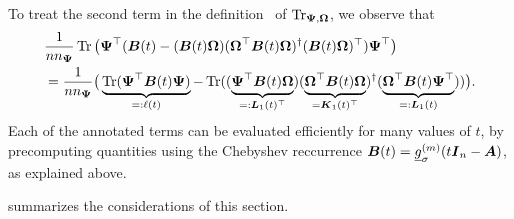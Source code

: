 To treat the second term in the definition~ of $\operatorname{Tr}_{\boldsymbol{\Psi}, \boldsymbol{\Omega}}$, we observe that 
\begin{align}
    &\frac{1}{n n_{\boldsymbol{\Psi}}} \operatorname{Tr} \big(\boldsymbol{\Psi}^{\top} (\boldsymbol{B}(t) - (\boldsymbol{B}(t) \boldsymbol{\Omega}) (\boldsymbol{\Omega}^{\top} \boldsymbol{B}(t) \boldsymbol{\Omega})^{\dagger} (\boldsymbol{B}(t) \boldsymbol{\Omega})^{\top}) \boldsymbol{\Psi}^{\top} \big) \notag \\
    &= \frac{1}{n n_{\boldsymbol{\Psi}}} \big( \underbrace{\operatorname{Tr}(\boldsymbol{\Psi}^{\top} \boldsymbol{B}(t)\boldsymbol{\Psi})}_{=: \ell(t)} - \operatorname{Tr}((\underbrace{\boldsymbol{\Psi}^{\top} \boldsymbol{B}(t) \boldsymbol{\Omega}}_{=: \boldsymbol{L}_1(t)^{\top}}) (\underbrace{\boldsymbol{\Omega}^{\top} \boldsymbol{B}(t) \boldsymbol{\Omega}}_{= \boldsymbol{K}_1(t)^{\top}})^{\dagger} (\underbrace{\boldsymbol{\Omega}^{\top} \boldsymbol{B}(t) \boldsymbol{\Psi}^{\top}}_{=: \boldsymbol{L}_1(t)})) \big).
    \label{equ:cyclic-property-hutchinson}
\end{align}
Each of the annotated terms can be evaluated efficiently for many values of $t$, by precomputing quantities using the Chebyshev reccurrence 
$\boldsymbol{B}(t) = \underline{g}_{\sigma}^{(m)}(t \boldsymbol{I}_n - \boldsymbol{A})$, as explained above.

 summarizes the considerations of this section.

